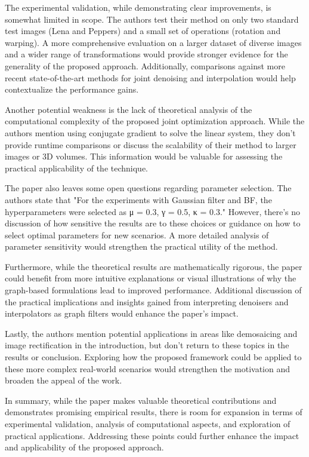 The experimental validation, while demonstrating clear improvements, is somewhat limited in scope. The authors test their method on only two standard test images (Lena and Peppers) and a small set of operations (rotation and warping). A more comprehensive evaluation on a larger dataset of diverse images and a wider range of transformations would provide stronger evidence for the generality of the proposed approach. Additionally, comparisons against more recent state-of-the-art methods for joint denoising and interpolation would help contextualize the performance gains.

Another potential weakness is the lack of theoretical analysis of the computational complexity of the proposed joint optimization approach. While the authors mention using conjugate gradient to solve the linear system, they don't provide runtime comparisons or discuss the scalability of their method to larger images or 3D volumes. This information would be valuable for assessing the practical applicability of the technique.

The paper also leaves some open questions regarding parameter selection. The authors state that "For the experiments with Gaussian filter and BF, the hyperparameters were selected as μ = 0.3, γ = 0.5, κ = 0.3." However, there's no discussion of how sensitive the results are to these choices or guidance on how to select optimal parameters for new scenarios. A more detailed analysis of parameter sensitivity would strengthen the practical utility of the method.

Furthermore, while the theoretical results are mathematically rigorous, the paper could benefit from more intuitive explanations or visual illustrations of why the graph-based formulations lead to improved performance. Additional discussion of the practical implications and insights gained from interpreting denoisers and interpolators as graph filters would enhance the paper's impact.

Lastly, the authors mention potential applications in areas like demosaicing and image rectification in the introduction, but don't return to these topics in the results or conclusion. Exploring how the proposed framework could be applied to these more complex real-world scenarios would strengthen the motivation and broaden the appeal of the work.

In summary, while the paper makes valuable theoretical contributions and demonstrates promising empirical results, there is room for expansion in terms of experimental validation, analysis of computational aspects, and exploration of practical applications. Addressing these points could further enhance the impact and applicability of the proposed approach.
